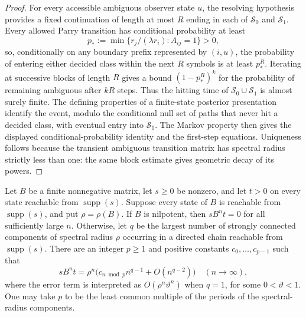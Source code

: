 \begin{proof}
For every accessible ambiguous observer state $u$, the resolving hypothesis
provides a fixed continuation of length at most $R$ ending in each of
$\mathcal S_0$ and $\mathcal S_1$.  Every allowed Parry transition has
conditional probability at least
\[
p_*:=\min\{r_j/(\lambda r_i):A_{ij}=1\}>0,
\]
so, conditionally on any boundary prefix represented by $(i,u)$, the
probability of entering either decided class within the next $R$ symbols is at
least $p_*^R$.  Iterating at successive blocks of length $R$ gives a bound
$(1-p_*^R)^k$ for the probability of remaining ambiguous after $kR$ steps.
Thus the hitting time of $\mathcal S_0\cup\mathcal S_1$ is almost surely
finite.  The defining properties of a finite-state posterior presentation
identify the event, modulo the conditional null set of paths that never hit a
decided class, with eventual entry into $\mathcal S_1$.  The Markov property
then gives the displayed conditional-probability identity and the first-step
equations.  Uniqueness follows because the transient ambiguous transition
matrix has spectral radius strictly less than one: the same block estimate
gives geometric decay of its powers.
\end{proof}

\begin{lemma}
\label{lem:periodic-polynomial-matrix-coefficients}
Let $B$ be a finite nonnegative matrix, let $s\ge0$ be nonzero, and let
$t>0$ on every state reachable from $\operatorname{supp}(s)$.  Suppose every
state of $B$ is reachable from $\operatorname{supp}(s)$, and put
$\rho=\rho(B)$.  If $B$ is nilpotent, then $sB^nt=0$ for all sufficiently large
$n$.  Otherwise, let $q$ be the largest number of strongly connected
components of spectral radius $\rho$ occurring in a directed chain reachable
from $\operatorname{supp}(s)$.  There are an integer $p\ge1$ and positive
constants $c_0,\ldots,c_{p-1}$ such that
\[
sB^nt=\rho^n\bigl(c_{n\bmod p}n^{q-1}+O(n^{q-2})\bigr)
\quad(n\to\infty),
\]
where the error term is interpreted as $O(\rho^n\vartheta^n)$ when $q=1$, for
some $0<\vartheta<1$.  One may take $p$ to be the least common multiple of
the periods of the spectral-radius components.
\end{lemma}

